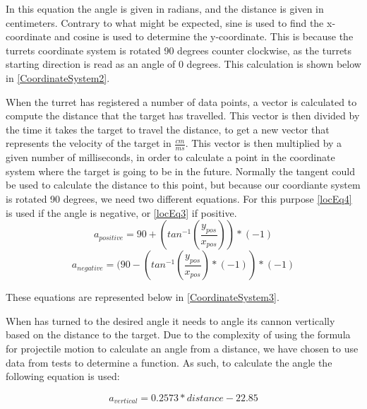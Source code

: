 In this equation the angle  is given in radians, and the distance
 is given in centimeters. Contrary to what might be expected, sine
is used to find the x-coordinate and cosine is used to determine the
y-coordinate. This is because the turrets coordinate system is rotated 90
degrees counter clockwise, as the turrets starting direction is read as an angle
of 0 degrees. This calculation is shown below in \autoref{CoordinateSystem2}.


When the turret has registered a number of data points, a vector is
calculated to compute the distance that the target has travelled. This vector is
then divided by the time it takes the target to travel the distance, to get a
new vector that represents the velocity of the target in $\frac{cm}{ms}$. This
vector is then multiplied by a given number of milliseconds, in order to
calculate a point in the coordinate system where the target is going to be in
the future. Normally the tangent could be used to calculate the distance
to this point, but because our coordiante system is rotated 90 degrees, we need two
different equations. For this purpose \autoref{locEq4} is used if the angle is
negative, or \autoref{locEq3} if positive.
\begin{equation}\label{locEq3}
a_{positive}=90+(tan^{-1}(\frac{y_{pos}}{x_{pos}}))*(-1)
\end{equation} 
\begin{equation}\label{locEq4}
a_{negative}=(90-(tan^{-1}(\frac{y_{pos}}{x_{pos}})*(-1))*(-1)
\end{equation} 

These equations are represented below in \autoref{CoordinateSystem3}.


When \name has turned to the desired angle it needs to angle its cannon
vertically based on the distance to the target. Due to the complexity of using
the formula for projectile motion to calculate an angle from a distance, we have
chosen to use data from tests to determine a function. As such, to calculate the
angle the following equation is used:

\begin{equation}\label{locEq4}
a_{vertical}=0.2573*distance-22.85
\end{equation} 

